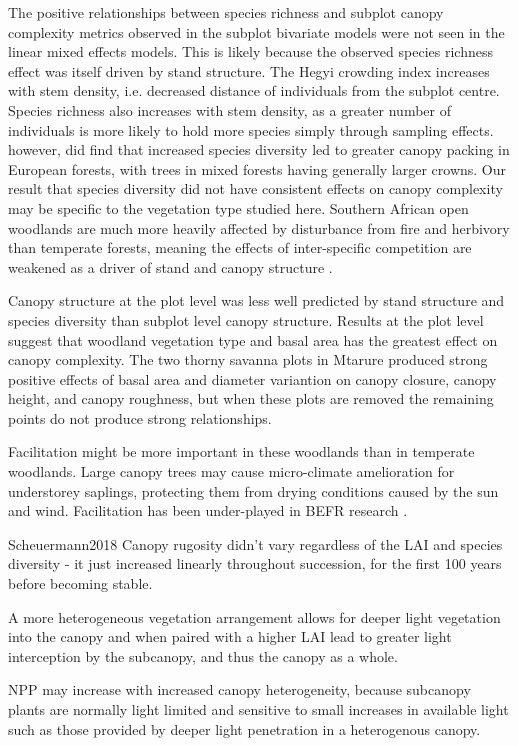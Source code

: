 \documentclass[11pt,a4paper]{article}
\begin{document}
The positive relationships between species richness and subplot canopy complexity metrics observed in the subplot bivariate models were not seen in the linear mixed effects models. This is likely because the observed species richness effect was itself driven by stand structure. The Hegyi crowding index increases with stem density, i.e. decreased distance of individuals from the subplot centre. Species richness also increases with stem density, as a greater number of individuals is more likely to hold more species simply through sampling effects. \citet{Jucker2015} however, did find that increased species diversity led to greater canopy packing in European forests, with trees in mixed forests having generally larger crowns. Our result that species diversity did not have consistent effects on canopy complexity may be specific to the vegetation type studied here. Southern African open woodlands are much more heavily affected by disturbance from fire and herbivory than temperate forests, meaning the effects of inter-specific competition are weakened as a driver of stand and canopy structure \citep{}.

Canopy structure at the plot level was less well predicted by stand structure and species diversity than subplot level canopy structure. Results at the plot level suggest that woodland vegetation type and basal area has the greatest effect on canopy complexity. The two thorny savanna plots in Mtarure produced strong positive effects of basal area and diameter variantion on canopy closure, canopy height, and canopy roughness, but when these plots are removed the remaining points do not produce strong relationships. 

Facilitation might be more important in these woodlands than in temperate woodlands. Large canopy trees may cause micro-climate amelioration for understorey saplings, protecting them from drying conditions caused by the sun and wind. Facilitation has been under-played in BEFR research \citep{Wright2021}.

Scheuermann2018
Canopy rugosity didn't vary regardless of the LAI and species diversity - it just increased linearly throughout succession, for the first 100 years before becoming stable.

A more heterogeneous vegetation arrangement allows for deeper light vegetation into the canopy and when paired with a higher LAI lead to greater light interception by the subcanopy, and thus the canopy as a whole.

NPP may increase with increased canopy heterogeneity, because subcanopy plants are normally light limited and sensitive to small increases in available light such as those provided by deeper light penetration in a heterogenous canopy.
\end{document}
